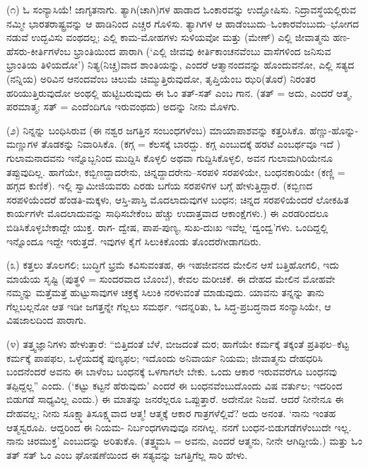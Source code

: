 (೧) ಓ ಸಂನ್ಯಾಸಿಯೆ! ಜಾಗೃತನಾಗು. ತ್ಯಾಗಿ(ಚಾಗಿ)ಗಳ ಹಾಡಾದ ಓಂಕಾರವನ್ನು ಉದ್ಘೋಷಿಸು. ನಿದ್ರಾವಸ್ಥೆಯಲ್ಲಿರುವ ನಮ್ಮೀ ಭಾರತರಾಷ್ಟ್ರವನ್ನು ಆ ಹಾಡಿನಿಂದ ಎಚ್ಚರ ಗೊಳಿಸು. ತ್ಯಾಗಿಗಳ ಆ ಹಾಡೆಂಬುದು–ಓಂಕಾರವೆಂಬುದು–ಭೋಗದ ನಡುವೆ ಉದ್ಭವಿಸು ವಂಥದಲ್ಲ; ಎಲ್ಲಿ ಕಾಮ-ಮೋಹಗಳು ಸುಳಿಯವೋ ಮತ್ತು (ಮೇಣ್) ಎಲ್ಲಿ ಜೀವಾತ್ಮನು ಹಣ-ಹೆಸರು-ಕೀರ್ತಿಗಳೆಂಬ ಭ್ರಾಂತಿಯಿಂದ ಪಾರಾಗಿ (‘ಎಲ್ಲಿ ಜೀವವು ಕೀರ್ತಿಕಾಂಚನವೆಂಬು ವಾಸೆಗಳಿಂದ ಜನಿಸುವ ಭ್ರಾಂತಿಯ ತಿಳಿಯದೋ’) ನಿತ್ಯ(ನಿಚ್ಚ)ವಾದ ಶಾಂತಿಯನ್ನು, ಎಂದರೆ ಆತ್ಮಾನಂದವನ್ನು ಹೊಂದುವನೋ, ಎಲ್ಲಿ ಸತ್ಯದ (ನನ್ನಿಯ) ಅರಿವಿನ ಆನಂದವೆಂಬ ಚಿಲುಮೆ ಚಿಮ್ಮುತ್ತಿರುವುದೋ, ತೃಪ್ತಿಯೆಂಬ ಝರಿ(ತೊರೆ) ನಿರಂತರ ಹರಿಯುತ್ತಿರುವುದೋ ಅಂಥಲ್ಲಿ ಹುಟ್ಟಿಬರುವುದು ಈ ಓಂ ತತ್-ಸತ್ ಎಂಬ ಗಾನ. (ತತ್ = ಅದು, ಎಂದರೆ ಆತ್ಮ, ಪರಮಾತ್ಮ; ಸತ್ = ಎಂದೆಂದಿಗೂ ಇರುವಂಥದು) ಅದನ್ನು ನೀನು ಮೊಳಗು.

(೨) ನಿನ್ನನ್ನು ಬಂಧಿಸಿರುವ (ಈ ನಶ್ವರ ಜಗತ್ತಿನ ಸಂಬಂಧಗಳೆಂಬ) ಮಾಯಾಪಾಶವನ್ನು ಕತ್ತರಿಸಿಕೊ. ಹೆಣ್ಣು-ಹೊನ್ನು-ಮಣ್ಣುಗಳ ತೊಡಕನ್ನು ನಿವಾರಿಸಿಕೊ. (ಕಗ್ಗ = ಕೆಲಸಕ್ಕೆ ಬಾರದ್ದು. ಕಗ್ಗ ಎಂಬುದಕ್ಕೆ ಹರಟೆ ಎಂಬರ್ಥವೂ ಇದೆ ) ಗುಲಾಮನಾದವನು ಇನ್ನೊಬ್ಬನಿಂದ ಮುದ್ದಿಸಿ ಕೊಳ್ಳಲಿ ಅಥವಾ ಗುದ್ದಿಸಿಕೊಳ್ಳಲಿ, ಅವನ ಗುಲಾಮಗಿರಿಯೇನೂ ತಪ್ಪುವುದಿಲ್ಲ. ಹಾಗೆಯೇ, ಕಬ್ಬಿಣದ್ದಾದರೇನು, ಚಿನ್ನದ್ದಾದರೇನು–ಸರಪಳಿ ಸರಪಳಿಯೇ, ಬಂಧನಕಾರಿಯೇ (ಕಣ್ಣಿ = ಹಗ್ಗದ ಕುಣಿಕೆ). ಇಲ್ಲಿ ಸ್ವಾಮೀಜಿಯವರು ಎರಡು ಬಗೆಯ ಸರಪಳಿಗಳ ಬಗ್ಗೆ ಹೇಳುತ್ತಿದ್ದಾರೆ. (ಕಬ್ಬಿಣದ ಸರಪಳಿಯೆಂದರೆ ಹೆಂಡತಿ-ಮಕ್ಕಳು, ಆಸ್ತಿ-ಪಾಸ್ತಿ ಮೊದಲಾದುವುಗಳ ಬಂಧನ; ಚಿನ್ನದ ಸರಪಳಿಯೆಂದರೆ ಲೋಕಹಿತ ಕಾರ್ಯಗಳೇ ಮೊದಲಾದುವನ್ನು ಸಾಧಿಸಬೇಕೆಂಬ ಹೆಚ್ಚು ಉದಾತ್ತವಾದ ಆಕಾಂಕ್ಷೆಗಳು.) ಈ ಎರಡರಿಂದಲೂ ಬಿಡಿಸಿಕೊಳ್ಳಬೇಕಾದ್ದೇ ಯುಕ್ತ. ರಾಗ- ದ್ವೇಷ, ಪಾಪ-ಪುಣ್ಯ, ಸುಖ-ದುಃಖ ಇವೆಲ್ಲ ‘ದ್ವಂದ್ವ’ಗಳು. ಒಂದಿದ್ದಲ್ಲಿ ಇನ್ನೊಂದೂ ಇದ್ದೇ ಇರುತ್ತದೆ. ಇವುಗಳ ಕೈಗೆ ಸಿಲುಕಿಕೊಂಡು ತೊಂದರೆಗೀಡಾಗದಿರು.

(೩) ಕತ್ತಲು ತೊಲಗಲಿ; ಬುದ್ಧಿಗೆ ಭ್ರಮೆ ಕವಿಸುವಂತಹ, ಈ ಇಹಜೀವನದ ಮೇಲಿನ ಆಸೆ ಬತ್ತಿಹೋಗಲಿ, ಇದು ಮಾಯೆಯ ಸೃಷ್ಟಿ (ಪುತ್ಥಳಿ = ಸುಂದರವಾದ ಬೊಂಬೆ), ಕೇವಲ ಮರೀಚಿಕೆ. ಈ ದೇಹದ ಮೇಲಿನ ಮೋಹವೇ ನಮ್ಮನ್ನು ಮತ್ತೆಮತ್ತೆ ಹುಟ್ಟುಸಾವುಗಳ ಚಕ್ರಕ್ಕೆ ಸಿಲುಕಿ ನರಳುವಂತೆ ಮಾಡುವುದು. ಯಾವನು ತನ್ನನ್ನು ತಾನು ಗೆಲ್ಲಬಲ್ಲನೋ ಆತ ಇಡೀ ಜಗತ್ತನ್ನೇ ಗೆಲ್ಲಲು ಸಮರ್ಥ. ಇದನ್ನರಿತು, ಓ ಸಿದ್ಧ-ಪ್ರಬದ್ಧನಾದ ಸಂನ್ಯಾಸಿಯೇ, ಆ ವಿಷಜಾಲದಿಂದ ಪಾರಾಗು.

(೪) ತತ್ತ್ವಜ್ಞಾನಿಗಳು ಹೇಳುತ್ತಾರೆ: “ಬಿತ್ತಿದಂತೆ ಬೆಳೆ, ಬೀಜದಂತೆ ಮರ; ಹಾಗೆಯೇ ಕರ್ಮಕ್ಕೆ ತಕ್ಕಂತೆ ಪ್ರತಿಫಲ–ಕೆಟ್ಟ ಕರ್ಮಕ್ಕೆ ಪಾಪಫಲ, ಒಳ್ಳೆಯದಕ್ಕೆ ಪುಣ್ಯಫಲ; ಇದೊಂದು ಅನಿವಾರ್ಯ ನಿಯಮ; ಜೀವಾತ್ಮನು ದೇಹಧರಿಸಿ ಬಂದನೆಂದರೆ ಅವನು ಈ ಬಾಳೆಂಬ ಬಂಧನಕ್ಕೆ ಒಳಗಾಗಲೇ ಬೇಕು. ಒಂದು ಆಕಾರ ಇರುವವರೆಗೂ ಬಂಧನವು ತಪ್ಪಿದ್ದಲ್ಲ” ಎಂದು. (‘ಕಟ್ಟು ಕಟ್ಟನೆ ಹೆರುವುದು’ ಎಂದರೆ ಈ ಬಂಧನವೆಂಬುದೊಂದು ವಿಷ ವರ್ತುಲ; ಇದರಿಂದ ಬಿಡುಗಡೆ ಸಾಧ್ಯವಿಲ್ಲ ಎಂದು.) ಈ ಮಾತನ್ನು ಜನರೆಲ್ಲರೂ ಒಪ್ಪುತ್ತಾರೆ. ಅದೇನೋ ನಿಜವೆ. ಆದರೆ ನೀನೇನೂ ಈ ದೇಹವಲ್ಲ; ನೀನು ಸೂಕ್ಷ್ಮಾತಿಸೂಕ್ಷ್ಮವಾದ ಆತ್ಮ! ಆತ್ಮಕ್ಕೆ ಆಕಾರ ಗಾತ್ರಗಳೆಲ್ಲಿವೆ? ಅದು ಅನಂತ. ‘ನಾನು ಇಂತಹ ಆತ್ಮಸ್ವರೂಪಿ. ಆದ್ದರಿಂದ ಈ ನಿಯಮ- ನಿರ್ಬಂಧಗಳಾವುವೂ ನನಗಿಲ್ಲ. ನನಗೆ ಬಂಧನ-ಬಿಡುಗಡೆಗಳೆಂಬುದೇ ಇಲ್ಲ. ನಾನು ಚಿರಮುಕ್ತ’ ಎಂಬುದನ್ನು ಅರಿತುಕೊ. (ತತ್ತ್ವಮಸಿ = ಅವನು, ಎಂದರೆ ಆತ್ಮನು, ನೀನೇ ಆಗಿದ್ದೀಯೆ.) ಮತ್ತು ಓಂ ತತ್ ಸತ್ ಓಂ ಎಂಬ ಘೋಷಣೆಯಿಂದ ಈ ಸತ್ಯವನ್ನು ಜಗತ್ತಿಗೆಲ್ಲ ಸಾರಿ ಹೇಳು.

